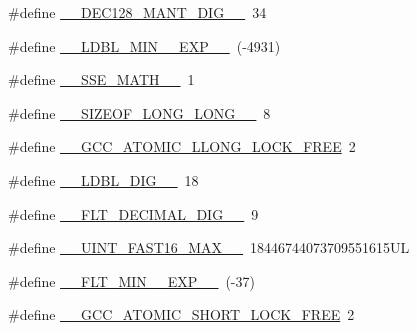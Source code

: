 \begin{DoxyCompactItemize}
\item 
\#define \hyperlink{build-analizer__host-_desktop___qt__5__9__0___g_c_c__64bit-_release_2moc__predefs_8h_adeff56b51aead6443852cacac294d464}{\+\_\+\+\_\+\+D\+E\+C128\+\_\+\+M\+A\+N\+T\+\_\+\+D\+I\+G\+\_\+\+\_\+}~34
\item 
\#define \hyperlink{build-analizer__host-_desktop___qt__5__9__0___g_c_c__64bit-_release_2moc__predefs_8h_aa0d249d82751bd4ee0280990bc510371}{\+\_\+\+\_\+\+L\+D\+B\+L\+\_\+\+M\+I\+N\+\_\+\_\+\+E\+X\+P\+\_\+\+\_\+}~(-\/4931)
\item 
\#define \hyperlink{build-analizer__host-_desktop___qt__5__9__0___g_c_c__64bit-_release_2moc__predefs_8h_ad378f6ccbd0d54016bda020b78adbbcb}{\+\_\+\+\_\+\+S\+S\+E\+\_\+\+M\+A\+T\+H\+\_\+\+\_\+}~1
\item 
\#define \hyperlink{build-analizer__host-_desktop___qt__5__9__0___g_c_c__64bit-_release_2moc__predefs_8h_a68e0683c8f359f7d7e013706fbcc2040}{\+\_\+\+\_\+\+S\+I\+Z\+E\+O\+F\+\_\+\+L\+O\+N\+G\+\_\+\+L\+O\+N\+G\+\_\+\+\_\+}~8
\item 
\#define \hyperlink{build-analizer__host-_desktop___qt__5__9__0___g_c_c__64bit-_release_2moc__predefs_8h_afb3458ec122d5fb5304b68bc48184e4e}{\+\_\+\+\_\+\+G\+C\+C\+\_\+\+A\+T\+O\+M\+I\+C\+\_\+\+L\+L\+O\+N\+G\+\_\+\+L\+O\+C\+K\+\_\+\+F\+R\+E\+E}~2
\item 
\#define \hyperlink{build-analizer__host-_desktop___qt__5__9__0___g_c_c__64bit-_release_2moc__predefs_8h_a3aa761811887b1634bfca566fa671424}{\+\_\+\+\_\+\+L\+D\+B\+L\+\_\+\+D\+I\+G\+\_\+\+\_\+}~18
\item 
\#define \hyperlink{build-analizer__host-_desktop___qt__5__9__0___g_c_c__64bit-_release_2moc__predefs_8h_ad666d9aaf02b587abdeffff5ce3545e2}{\+\_\+\+\_\+\+F\+L\+T\+\_\+\+D\+E\+C\+I\+M\+A\+L\+\_\+\+D\+I\+G\+\_\+\+\_\+}~9
\item 
\#define \hyperlink{build-analizer__host-_desktop___qt__5__9__0___g_c_c__64bit-_release_2moc__predefs_8h_a5db559b8fe7a2135f05686e92ce64d9d}{\+\_\+\+\_\+\+U\+I\+N\+T\+\_\+\+F\+A\+S\+T16\+\_\+\+M\+A\+X\+\_\+\+\_\+}~18446744073709551615\+U\+L
\item 
\#define \hyperlink{build-analizer__host-_desktop___qt__5__9__0___g_c_c__64bit-_release_2moc__predefs_8h_a442f6e00169e1726f7b9a05eb3c617d8}{\+\_\+\+\_\+\+F\+L\+T\+\_\+\+M\+I\+N\+\_\+\_\+\+E\+X\+P\+\_\+\+\_\+}~(-\/37)
\item 
\#define \hyperlink{build-analizer__host-_desktop___qt__5__9__0___g_c_c__64bit-_release_2moc__predefs_8h_a889943b266851fe7e9cdac86795507aa}{\+\_\+\+\_\+\+G\+C\+C\+\_\+\+A\+T\+O\+M\+I\+C\+\_\+\+S\+H\+O\+R\+T\+\_\+\+L\+O\+C\+K\+\_\+\+F\+R\+E\+E}~2

\end{DoxyCompactItemize}
